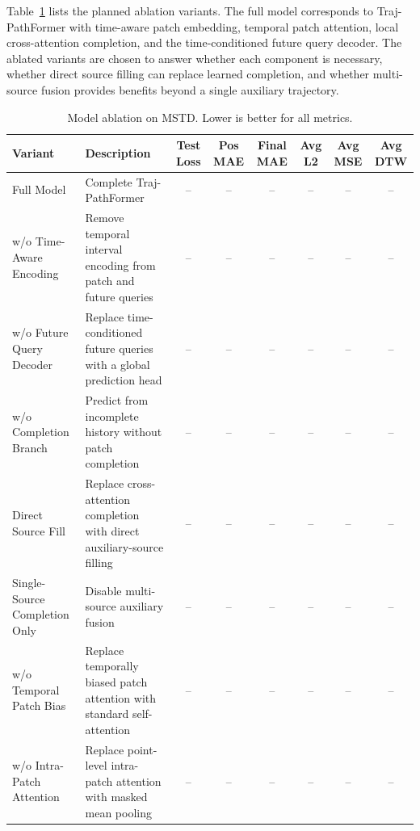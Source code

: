 Table~\ref{tab:model-ablation} lists the planned ablation variants. The full model corresponds to Traj-PathFormer with time-aware patch embedding, temporal patch attention, local cross-attention completion, and the time-conditioned future query decoder. The ablated variants are chosen to answer whether each component is necessary, whether direct source filling can replace learned completion, and whether multi-source fusion provides benefits beyond a single auxiliary trajectory.

\begin{table}[t]
    \centering
    \caption{Model ablation on MSTD. Lower is better for all metrics.}
    \label{tab:model-ablation}
    \small
    \begin{tabularx}{\textwidth}{lXcccccc}
        \hline
        Variant & Description & Test Loss & Pos MAE & Final MAE & Avg L2 & Avg MSE & Avg DTW \\
        \hline
        Full Model & Complete Traj-PathFormer & -- & -- & -- & -- & -- & -- \\
        w/o Time-Aware Encoding & Remove temporal interval encoding from patch and future queries & -- & -- & -- & -- & -- & -- \\
        w/o Future Query Decoder & Replace time-conditioned future queries with a global prediction head & -- & -- & -- & -- & -- & -- \\
        w/o Completion Branch & Predict from incomplete history without patch completion & -- & -- & -- & -- & -- & -- \\
        Direct Source Fill & Replace cross-attention completion with direct auxiliary-source filling & -- & -- & -- & -- & -- & -- \\
        Single-Source Completion Only & Disable multi-source auxiliary fusion & -- & -- & -- & -- & -- & -- \\
        w/o Temporal Patch Bias & Replace temporally biased patch attention with standard self-attention & -- & -- & -- & -- & -- & -- \\
        w/o Intra-Patch Attention & Replace point-level intra-patch attention with masked mean pooling & -- & -- & -- & -- & -- & -- \\
        \hline
    \end{tabularx}
\end{table}
